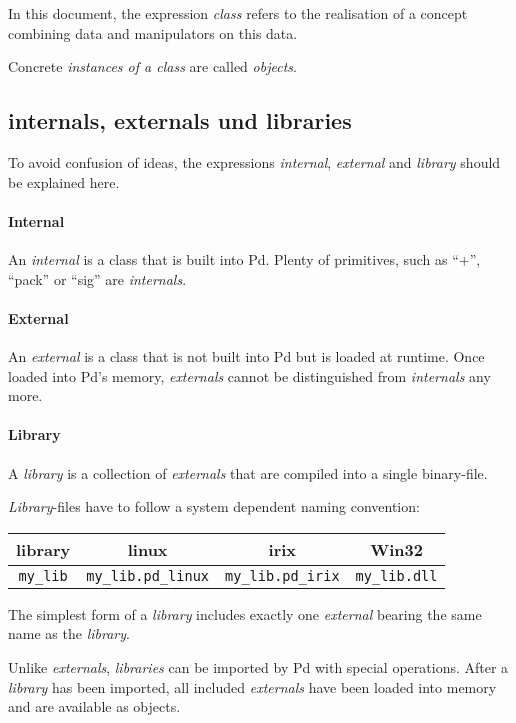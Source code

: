\documentclass[12pt, a4paper,english,titlepage]{article}
\begin{document}
In this document, the expression {\em class} refers to the realisation of a concept
combining data and manipulators on this data.

Concrete {\em instances of a class} are called {\em objects}.

\subsection{internals, externals und libraries}

To avoid confusion of ideas, the expressions {\em internal}, {\em external} and
{\em library} should be explained here.

\paragraph{Internal}
An {\em internal} is a class that is built into Pd.
Plenty of primitives, such as ``+'', ``pack'' or ``sig\pdtilde'' are {\em internals}.

\paragraph{External}
An {\em external} is a class that is not built into Pd but is loaded at runtime.
Once loaded into Pd's memory, {\em externals} cannot be distinguished from
{\em internals} any more.

\paragraph{Library}
A {\em library} is a collection of {\em externals} that are compiled into a 
single binary-file.

{\em Library}-files have to follow a system dependent naming convention:

\begin{tabular}{c||c|c|c}
library & linux&irix&Win32 \\
\hline
{\tt my\_lib}&{\tt  my\_lib.pd\_linux}&{\tt  my\_lib.pd\_irix}&
{\tt  my\_lib.dll}\\
\end{tabular}

The simplest form of a {\em library} includes exactly one {\em external}
bearing the same name as the {\em library}.

Unlike {\em externals}, {\em libraries} can be imported by Pd with special operations.
After a {\em library} has been imported,
all included {\em externals} have been loaded into memory and are available as objects.
\end{document}
